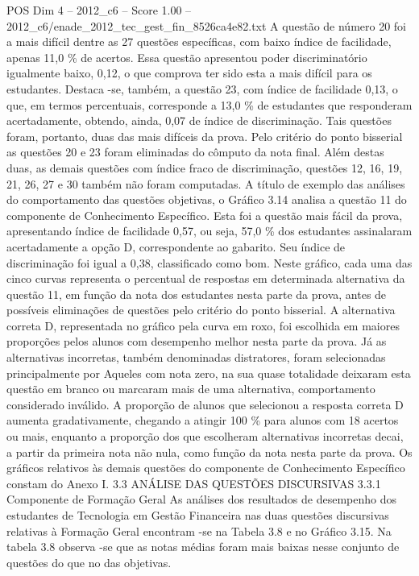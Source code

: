 \begin{textsample}{POS Dim 4 – 2012\_c6 – Score 1.00 – 2012\_c6/enade\_2012\_tec\_gest\_fin\_8526ca4e82.txt}
A questão de número 20 foi a mais difícil dentre as 27 questões específicas, com baixo índice de facilidade, apenas 11,0 \% de acertos.
Essa questão apresentou poder discriminatório igualmente baixo, 0,12, o que comprova ter sido esta a mais difícil para os estudantes.
Destaca -se, também, a questão 23, com índice de facilidade 0,13, o que, em termos percentuais, corresponde a 13,0 \% de estudantes que responderam acertadamente, obtendo, ainda, 0,07 de índice de discriminação.
Tais questões foram, portanto, duas das mais difíceis da prova.
Pelo critério do ponto bisserial as questões 20 e 23 foram eliminadas do cômputo da nota final.
Além destas duas, as demais questões com índice fraco de discriminação, questões 12, 16, 19, 21, 26, 27 e 30 também não foram computadas.
A título de exemplo das análises do comportamento das questões objetivas, o Gráfico 3.14 analisa a questão 11 do componente de Conhecimento Específico.
Esta foi a questão mais fácil da prova, apresentando índice de facilidade 0,57, ou seja, 57,0 \% dos estudantes assinalaram acertadamente a opção D, correspondente ao gabarito.
Seu índice de discriminação foi igual a 0,38, classificado como bom.
Neste gráfico, cada uma das cinco curvas representa o percentual de respostas em determinada alternativa da questão 11, em função da nota dos estudantes nesta parte da prova, antes de possíveis eliminações de questões pelo critério do ponto bisserial.
A alternativa correta D, representada no gráfico pela curva em roxo, foi escolhida em maiores proporções pelos alunos com desempenho melhor nesta parte da prova.
Já as alternativas incorretas, também denominadas distratores, foram selecionadas principalmente por Aqueles com nota zero, na sua quase totalidade deixaram esta questão em branco ou marcaram mais de uma alternativa, comportamento considerado inválido.
A proporção de alunos que selecionou a resposta correta D aumenta gradativamente, chegando a atingir 100 \% para alunos com 18 acertos ou mais, enquanto a proporção dos que escolheram alternativas incorretas decai, a partir da primeira nota não nula, como função da nota nesta parte da prova.
Os gráficos relativos às demais questões do componente de Conhecimento Específico constam do Anexo I. 3.3 ANÁLISE DAS QUESTÕES DISCURSIVAS 3.3.1 Componente de Formação Geral As análises dos resultados de desempenho dos estudantes de Tecnologia em Gestão Financeira nas duas questões discursivas relativas à Formação Geral encontram -se na Tabela 3.8 e no Gráfico 3.15.
Na tabela 3.8 observa -se que as notas médias foram mais baixas nesse conjunto de questões do que no das objetivas.

\end{textsample}
